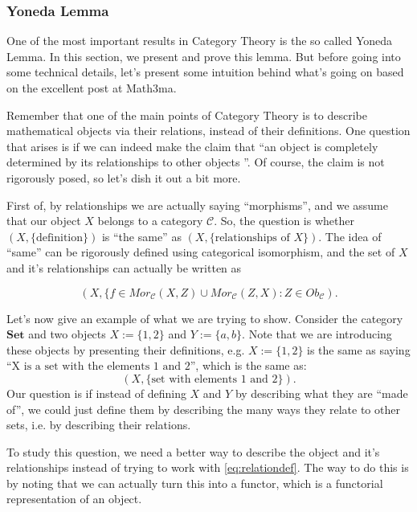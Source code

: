 \subsubsection{Yoneda Lemma}

One of the most important results in Category Theory is the so called Yoneda Lemma.
In this section, we present and prove this lemma. But before going into some
technical details, let's present some intuition behind what's
going on based on the excellent post at Math3ma.

Remember that one of the main points of Category Theory is to describe mathematical
objects via their relations, instead of their definitions. One question that
arises is if we can indeed make the claim that ``an object is
completely determined by its relationships to other objects
''. Of course, the claim is not rigorously posed, so let's dish it out a bit more.

First of, by relationships we are actually saying ``morphisms'',
and we assume that our object $X$ belongs to a category $\mathcal C$.
So, the question is whether $(X, \{\text{definition}\})$ is ``the same''
as $(X, \{\text{relationships of }X\})$. The idea of ``same'' can
be rigorously defined using categorical isomorphism, and the
set of $X$ and it's relationships can actually be written as

\begin{equation}
	(X, \{ f \in Mor_\mathcal C(X,Z) \cup Mor_\mathcal C(Z,X): Z \in Ob_\mathcal C).
	\label{eq:relationdef}
\end{equation}

Let's now give an example of what we are trying to show. Consider the category $\mathbf{Set}$
and two objects $X:=\{1,2\}$ and $Y :=\{a,b\}$. Note that we are introducing these objects
by presenting their definitions, e.g. $X:=\{1,2\}$ is the same as saying
``$\text{X is a set with the elements 1 and 2}$'', which is the same as:
\begin{displaymath}
	(X, \{\text{set with elements 1 and 2}\}).
\end{displaymath}
Our question is if instead of
defining $X$ and $Y$ by describing what they are ``made of'', we could just
define them by describing the many ways they relate to other sets, i.e. by describing their relations.

To study this question, we need a better way to describe the object and it's relationships
instead of trying to work with \eqref{eq:relationdef}. The way to do this is
by noting that we can actually turn this into a functor, which is
a functorial representation of an object.

